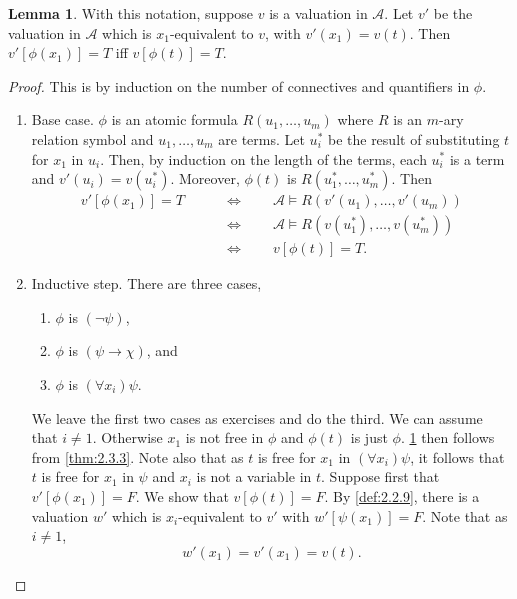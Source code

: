 \documentclass{article}
\newcommand{\A}{\mathcal{A}}
\newcommand{\rb}[1]{\left( #1 \right)}
\renewcommand{\sb}[1]{\left[ #1 \right]}
\newcommand{\notb}[1]{\rb{\neg #1}}
\newcommand{\impb}[2]{\rb{#1 \rightarrow #2}}
\newcommand{\fab}[1]{\rb{\forall #1}}
\theoremstyle{definition}\newtheorem{definition}{Definition}[subsection]
\theoremstyle{definition}\newtheorem{remark}[definition]{Remark}
\theoremstyle{definition}\newtheorem*{example}{Example}
\theoremstyle{definition}\newtheorem*{note}{Note}
\newtheorem{lemma}[definition]{Lemma}
\begin{document}
\begin{lemma}
\label{lem:2.3.7}
With this notation, suppose $ v $ is a valuation in $ \A $. Let $ v' $ be the valuation in $ \A $ which is $ x_1 $-equivalent to $ v $, with $ v'\rb{x_1} = v\rb{t} $. Then $ v'\sb{\phi\rb{x_1}} = T $ iff $ v\sb{\phi\rb{t}} = T $.
\end{lemma}

\begin{proof}
This is by induction on the number of connectives and quantifiers in $ \phi $.
\begin{enumerate}
\item Base case. $ \phi $ is an atomic formula $ R\rb{u_1, \dots, u_m} $ where $ R $ is an $ m $-ary relation symbol and $ u_1, \dots, u_m $ are terms. Let $ u^*_i $ be the result of substituting $ t $ for $ x_1 $ in $ u_i $. Then, by induction on the length of the terms, each $ u_i^* $ is a term and $ v'\rb{u_i} = v\rb{u_i^*} $. Moreover, $ \phi\rb{t} $ is $ R\rb{u_1^*, \dots, u_m^*} $. Then
\begin{align*}
v'\sb{\phi\rb{x_1}} = T \qquad
& \iff \qquad \A \vDash R\rb{v'\rb{u_1}, \dots, v'\rb{u_m}} \\
& \iff \qquad \A \vDash R\rb{v\rb{u_1^*}, \dots, v\rb{u_m^*}} \\
& \iff \qquad v\sb{\phi\rb{t}} = T.
\end{align*}
\item Inductive step. There are three cases,
\begin{enumerate}
\item $ \phi $ is $ \notb{\psi} $,
\item $ \phi $ is $ \impb{\psi}{\chi} $, and
\item $ \phi $ is $ \fab{x_i}\psi $.
\end{enumerate}
We leave the first two cases as exercises and do the third. We can assume that $ i \ne 1 $. Otherwise $ x_1 $ is not free in $ \phi $ and $ \phi\rb{t} $ is just $ \phi $. \ref{lem:2.3.7} then follows from \ref{thm:2.3.3}. Note also that as $ t $ is free for $ x_1 $ in $ \fab{x_i}\psi $, it follows that $ t $ is free for $ x_1 $ in $ \psi $ and $ x_i $ is not a variable in $ t $. Suppose first that $ v'\sb{\phi\rb{x_1}} = F $. We show that $ v\sb{\phi\rb{t}} = F $. By \ref{def:2.2.9}, there is a valuation $ w' $ which is $ x_i $-equivalent to $ v' $ with $ w'\sb{\psi\rb{x_1}} = F $. Note that as $ i \ne 1 $,
\begin{equation}
\label{eq:5}
w'\rb{x_1} = v'\rb{x_1} = v\rb{t}.
\end{equation}

\end{enumerate}
\end{proof}
\end{document}
